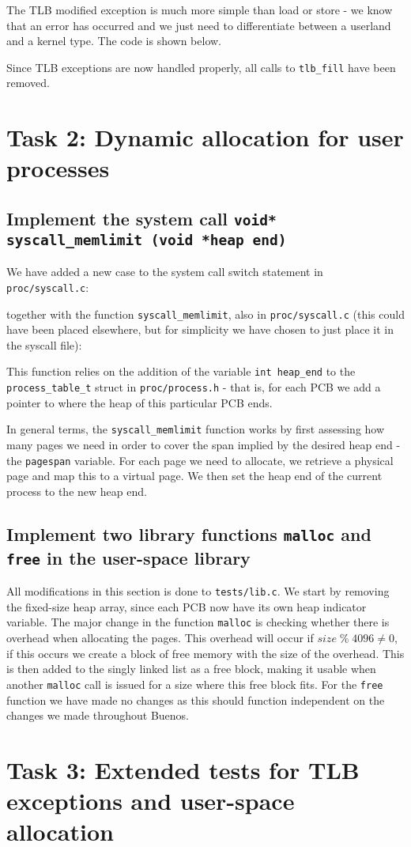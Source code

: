 \documentclass[a4paper,12pt]{article}
\begin{document}
The TLB modified exception is much more simple than load or store - we know that an error has occurred and we just need to differentiate between a userland and a kernel type. The code is shown below. 


Since TLB exceptions are now handled properly, all calls to \texttt{tlb\_fill} have been removed.

\section{Task 2: Dynamic allocation for user processes}

\subsection{Implement the system call \texttt{void* syscall\_memlimit (void *heap end)}}

We have added a new case to the system call switch statement in \texttt{proc/syscall.c}:

together with the function \texttt{syscall\_memlimit}, also in \texttt{proc/syscall.c} (this could have been placed elsewhere, but for simplicity we have chosen to just place it in the syscall file):


This function relies on the addition of the variable \texttt{int heap\_end} to the \texttt{process\_table\_t} struct in \texttt{proc/process.h} - that is, for each PCB we add a pointer to where the heap of this particular PCB ends.

In general terms, the \texttt{syscall\_memlimit} function works by first assessing how many pages we need in order to cover the span implied by the desired heap end - the \texttt{pagespan} variable. For each page we need to allocate, we retrieve a physical page and map this to a virtual page. We then set the heap end of the current process to the new heap end.

\subsection{Implement two library functions \texttt{malloc} and \texttt{free} in the user-space library}

All modifications in this section is done to \texttt{tests/lib.c}. We start by removing the fixed-size heap array, since each PCB now have its own heap indicator variable. The major change in the function \texttt{malloc} is checking whether there is overhead when allocating the pages. This overhead will occur if $size\; \% \; 4096 \neq 0$, if this occurs we create a block of free memory with the size of the overhead. This is then added to the singly linked list as a free block, making it usable when another \texttt{malloc} call is issued for a size where this free block fits. For the \texttt{free} function we have made no changes as this should function independent on the changes we made throughout Buenos.



\section{Task 3: Extended tests for TLB exceptions and user-space allocation}
\end{document}
